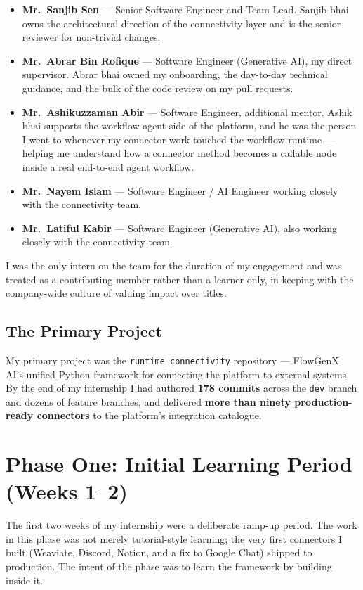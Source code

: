 \begin{itemize}[leftmargin=*]
    \item \textbf{Mr.~Sanjib Sen} --- Senior Software Engineer and
    Team Lead. Sanjib bhai owns the architectural direction of the
    connectivity layer and is the senior reviewer for non-trivial
    changes.
    \item \textbf{Mr.~Abrar Bin Rofique} --- Software Engineer
    (Generative AI), my direct supervisor. Abrar bhai owned my
    onboarding, the day-to-day technical guidance, and the bulk of
    the code review on my pull requests.
    \item \textbf{Mr.~Ashikuzzaman Abir} --- Software Engineer,
    additional mentor. Ashik bhai supports the workflow-agent side of
    the platform, and he was the person I went to whenever my
    connector work touched the workflow runtime --- helping me
    understand how a connector method becomes a callable node inside
    a real end-to-end agent workflow.
    \item \textbf{Mr.~Nayem Islam} --- Software Engineer / AI
    Engineer working closely with the connectivity team.
    \item \textbf{Mr.~Latiful Kabir} --- Software Engineer
    (Generative AI), also working closely with the connectivity team.
\end{itemize}

I was the only intern on the team for the duration of my engagement
and was treated as a contributing member rather than a learner-only,
in keeping with the company-wide culture of valuing impact over
titles.

\subsection{The Primary Project}
My primary project was the \texttt{runtime\_connectivity} repository
--- FlowGenX AI's unified Python framework for connecting the platform
to external systems. By the end of my internship I had authored
\textbf{178 commits} across the \texttt{dev} branch and dozens of
feature branches, and delivered \textbf{more than ninety
production-ready connectors} to the platform's integration catalogue.

\section{Phase One: Initial Learning Period (Weeks 1--2)}
The first two weeks of my internship were a deliberate ramp-up
period. The work in this phase was not merely tutorial-style learning;
the very first connectors I built (Weaviate, Discord, Notion, and a
fix to Google Chat) shipped to production. The intent of the phase
was to learn the framework by building inside it.

